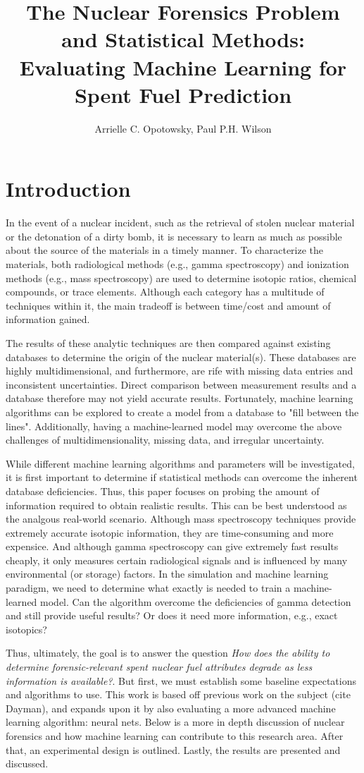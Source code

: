 \documentclass{anstrans}
\title{%
The Nuclear Forensics Problem and Statistical Methods: \\
Evaluating Machine Learning for Spent Fuel Prediction
}
\author{Arrielle C. Opotowsky, Paul P.H. Wilson}
\institute{
Computational Nuclear Engineering Research Group \\
University of Wisconsin at Madison
}
\begin{document}
\section{Introduction}

In the event of a nuclear incident, such as the retrieval of stolen nuclear
material or the detonation of a dirty bomb, it is necessary to learn as much as
possible about the source of the materials in a timely manner. To characterize
the materials, both radiological methods (e.g., gamma spectroscopy) and
ionization methods (e.g., mass spectroscopy) are used to determine isotopic
ratios, chemical compounds, or trace elements. Although each category has a
multitude of techniques within it, the main tradeoff is between time/cost and
amount of information gained. 

The results of these analytic techniques are then compared against existing
databases to determine the origin of the nuclear material(s). These databases
are highly multidimensional, and furthermore, are rife with missing data
entries and inconsistent uncertainties. Direct comparison between measurement
results and a database therefore may not yield accurate results. Fortunately,
machine learning algorithms can be explored to create a model from a database
to "fill between the lines".  Additionally, having a machine-learned model may
overcome the above challenges of multidimensionality, missing data, and
irregular uncertainty.

While different machine learning algorithms and parameters will be
investigated, it is first important to determine if statistical methods can
overcome the inherent database deficiencies. Thus, this paper focuses on
probing the amount of information required to obtain realistic results.  This
can be best understood as the analgous real-world scenario.  Although mass
spectroscopy techniques provide extremely accurate isotopic information, they
are time-consuming and more expensice. And although gamma spectroscopy can give
extremely fast results cheaply, it only measures certain radiological signals
and is influenced by many environmental (or storage) factors. In the simulation
and machine learning paradigm, we need to determine what exactly is needed to
train a machine-learned model. Can the algorithm overcome the deficiencies of
gamma detection and still provide useful results? Or does it need more
information, e.g., exact isotopics?

Thus, ultimately, the goal is to answer the question \textit{How does the
ability to determine forensic-relevant spent nuclear fuel attributes degrade as
less information is available?}. But first, we must establish some baseline
expectations and algorithms to use. This work is based off previous work on the
subject (cite Dayman), and expands upon it by also evaluating a more advanced
machine learning algorithm: neural nets. Below is a more in depth discussion of
nuclear forensics and how machine learning can contribute to this research
area. After that, an experimental design is outlined. Lastly, the results are
presented and discussed. 
\end{document}
